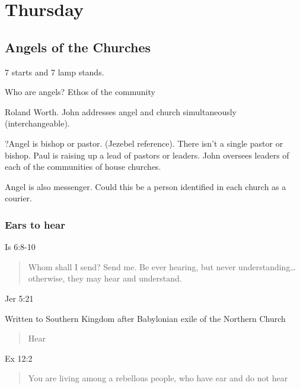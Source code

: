 \documentclass[
]{book}
\begin{document}
\hypertarget{section}{%
\subsubsection{}\label{section}}

\hypertarget{thursday}{%
\chapter{Thursday}\label{thursday}}

\hypertarget{angels-of-the-churches}{%
\section{Angels of the Churches}\label{angels-of-the-churches}}

7 starts and 7 lamp stands.

Who are angels? Ethos of the community

Roland Worth. John addresses angel and church simultaneously (interchangeable).

?Angel is bishop or pastor. (Jezebel reference). There isn't a single pastor or bishop. Paul is raising up a lead of pastors or leaders. John oversees leaders of each of the communities of house churches.

Angel is also messenger. Could this be a person identified in each church as a courier.

\hypertarget{ears-to-hear}{%
\subsection{Ears to hear}\label{ears-to-hear}}

Is 6:8-10

\begin{quote}
Whom shall I send? Send me. Be ever hearing, but never understanding\ldots{} otherwise, they may hear and understand.
\end{quote}

Jer 5:21

Written to Southern Kingdom after Babylonian exile of the Northern Church

\begin{quote}
Hear
\end{quote}

Ex 12:2

\begin{quote}
You are living among a rebellous people, who have ear and do not hear
\end{quote}
\end{document}
